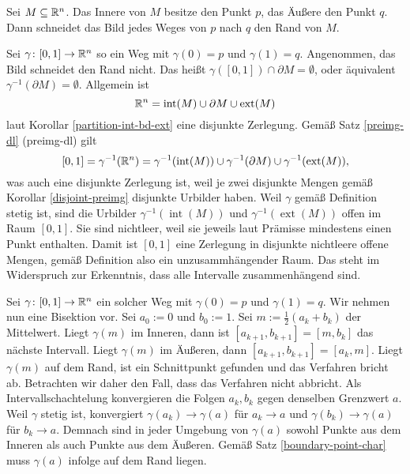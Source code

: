 \begin{Satz}
Sei $M\subseteq\mathbb R^n$. Das Innere von $M$ besitze den Punkt $p$,
das Äußere den Punkt $q$. Dann schneidet das Bild jedes Weges von $p$
nach $q$ den Rand von $M$.
\end{Satz}
\begin{Beweis}[Beweis 1]
Sei $\gamma\colon [0,1]\to\mathbb R^n$ so ein Weg mit
$\gamma(0)=p$ und $\gamma(1)=q$. Angenommen, das Bild schneidet
den Rand nicht. Das heißt $\gamma([0,1])\cap\partial M = \emptyset$,
oder äquivalent $\gamma^{-1}(\partial M)=\emptyset$.
Allgemein ist
\[\mathbb R^n = \operatorname{int}(M) \cup \partial M \cup \operatorname{ext}(M)\]
laut Korollar \ref{partition-int-bd-ext} eine disjunkte Zerlegung.
Gemäß Satz \ref{preimg-dl} (preimg-dl) gilt
\[[0,1] = \gamma^{-1}(\mathbb R^n) = \gamma^{-1}(\operatorname{int}(M))
\cup \gamma^{-1}(\partial M)\cup \gamma^{-1}(\operatorname{ext}(M)),\]
was auch eine disjunkte Zerlegung ist, weil je zwei disjunkte Mengen
gemäß Korollar \ref{disjoint-preimg} disjunkte Urbilder haben.
Weil $\gamma$ gemäß Definition stetig ist,
sind die Urbilder $\gamma^{-1}(\operatorname{int}(M))$ und
$\gamma^{-1}(\operatorname{ext}(M))$ offen im Raum $[0,1]$. Sie sind
nichtleer, weil sie jeweils laut Prämisse mindestens einen Punkt
enthalten. Damit ist $[0,1]$ eine Zerlegung in disjunkte nichtleere
offene Mengen, gemäß Definition also ein unzusammhängender Raum. Das
steht im Widerspruch zur Erkenntnis, dass alle Intervalle
zusammenhängend sind.\,\qedsymbol
\end{Beweis}

\begin{Beweis}[Beweis 2]
Sei $\gamma\colon [0,1]\to\mathbb R^n$ ein solcher Weg mit $\gamma(0)=p$ und
$\gamma(1)=q$. Wir nehmen nun eine Bisektion vor. Sei $a_0:=0$ und
$b_0:=1$. Sei $m:=\tfrac{1}{2}(a_{k}+b_{k})$ der Mittelwert. Liegt
$\gamma(m)$ im Inneren, dann ist $[a_{k+1},b_{k+1}]=[m,b_k]$ das nächste
Intervall. Liegt $\gamma(m)$ im Äußeren, dann $[a_{k+1},b_{k+1}]=[a_k,m]$.
Liegt $\gamma(m)$ auf dem Rand, ist ein Schnittpunkt gefunden und
das Verfahren bricht ab. Betrachten wir daher
den Fall, dass das Verfahren nicht abbricht. Als
Intervallschachtelung konvergieren die Folgen $a_k,b_k$ gegen
denselben Grenzwert $a$. Weil $\gamma$ stetig ist, konvergiert
$\gamma(a_k)\to \gamma(a)$ für $a_k\to a$ und $\gamma(b_k)\to\gamma(a)$
für $b_k\to a$. Demnach sind in jeder Umgebung von $\gamma(a)$ sowohl
Punkte aus dem Inneren als auch Punkte aus dem Äußeren. Gemäß
Satz \ref{boundary-point-char} muss $\gamma(a)$ infolge
auf dem Rand liegen.\,\qedsymbol
\end{Beweis}
